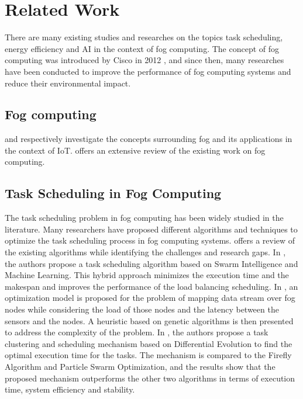 \chapter*{Related Work}
\label{chap:relatedwork}

There are many existing studies and researches on the topics task scheduling, energy efficiency and AI in the context
of fog computing. The concept of fog computing was introduced by Cisco in 2012 \cite{bonomi-et-al-2012}, and since
then, many researches have been conducted to improve the performance of fog computing systems and reduce their
environmental impact.

\section*{Fog computing}

\cite{rana-abubacker-2023} and \cite{abubacker-et-al-2023} respectively investigate the concepts surrounding fog
and its applications in the context of IoT. \cite{al-musawi-et-al-2023} offers an extensive review of the existing
work on fog computing.

\section*{Task Scheduling in Fog Computing}

The task scheduling problem in fog computing has been widely studied in the literature. Many researchers have proposed
different algorithms and techniques to optimize the task scheduling process in fog computing systems.
\cite{misirli-casalicchio-2024} offers a review of the existing algorithms while identifying the challenges and research
gaps. In \cite{rjoub-bentahar-2017}, the authors propose a task scheduling algorithm based on Swarm Intelligence and
Machine Learning. This hybrid approach minimizes the execution time and the makespan and improves the performance of
the load balancing scheduling. In \cite{canali-lancellotti-2019}, an optimization model is proposed for the problem of
mapping data stream over fog nodes while considering the load of those nodes and the latency between the sensors and
the nodes. A heuristic based on genetic algorithms is then presented to address the complexity of the problem. In
\cite{yousif-et-al-2024}, the authors propose a task clustering and scheduling mechanism based on Differential
Evolution to find the optimal execution time for the tasks. The mechanism is compared to the Firefly Algorithm and
Particle Swarm Optimization, and the results show that the proposed mechanism outperforms the other two algorithms in
terms of execution time, system efficiency and stability.


